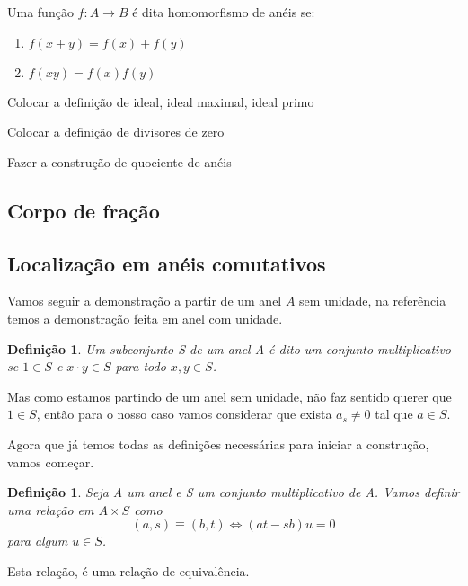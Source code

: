 \documentclass[10pt,a4paper]{article}
\newtheorem{definition}[theorem]{Definição}
\begin{document}
 Uma função $f:A \rightarrow B $ é dita homomorfismo de anéis se:
\begin{enumerate}
	\item $f(x+y)=f(x)+f(y)$
	\item $f(xy)=f(x)f(y)$
\end{enumerate}
 
 Colocar a definição de ideal, ideal maximal, ideal primo

 Colocar a definição de divisores de zero

 Fazer a construção de quociente de anéis


\subsection{Corpo de fração}

\subsection{Localização em anéis comutativos}

Vamos seguir a demonstração a partir de um anel $A$ sem unidade, na referência \cite{Atiyah} temos a demonstração feita em anel com unidade.

\begin{definition}
	Um subconjunto S de um anel A é dito um conjunto multiplicativo se $1 \in S$ e $ x\cdot y \in S$ para todo $x , y \in S$.
\end{definition}

Mas como estamos partindo de um anel sem unidade, não faz sentido querer que $1 \in S$, então para o nosso caso vamos considerar que exista $a_s \neq 0$ tal que $a \in S$.

Agora que já temos todas as definições necessárias para iniciar a construção, vamos começar.

\begin{definition}
	Seja A um anel e S um conjunto multiplicativo de A. Vamos definir uma relação em $A \times S$ como $$(a,s) \equiv (b, t) \Leftrightarrow (at-sb)u=0$$ para algum $u \in S$.
\end{definition}

Esta relação, é uma relação de equivalência.
\end{document}
